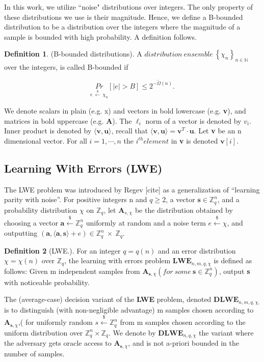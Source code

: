 \documentclass[10pt,journal,compsoc]{IEEEtran}
\theoremstyle{definition}
\newtheorem{definition}{Definition}[section]
\begin{document}
In this work, we utilize ``noise" distributions over integers. The only property of these distributions we use is their magnitude. Hence, we define a B-bounded distribution to be a distribution over the integers where the magnitude of a sample is bounded with high probability. A definition follows.


\begin{definition}

(B-bounded distributions). A $distribution\ ensemble \ \left\{ \chi_n \right\}_{n \in \mathbb{N}}$ over the integers, is called B-bounded if 

$$\underset{e \ \xleftarrow{\$} \ \chi_n}{Pr} \left[ \left| e\right|> B\right] \leq 2^{-\widetilde{\Omega}\left(n\right)}.$$

We denote scalars in plain (e.g. x) and vectors in bold lowercase (e.g. \textbf{v}), and matrices in bold uppercase (e.g. \textbf{A}).  The $\ell_i$ norm of a vector is denoted by $v_i$. Inner product is denoted by $\langle \textbf{v},\textbf{u} \rangle$, recall that $\langle \textbf{v},\textbf{u} \rangle = \textbf{v}^T \cdot \textbf{u}$. Let \textbf{v} be an n dimensional vector. For all $i = 1,\cdots,n$ the $i^{th} element$ in \textbf{v} is denoted $\textbf{v}[i]$.

\end{definition}

\subsection{Learning With Errors (LWE)}

The LWE problem was introduced by Regev [cite] as a generalization of “learning parity with
noise”. For positive integers n and $q \geq 2$, a vector $\textbf{s}\in \mathbb{Z}^n_q$, and a probability distribution $\chi$ on $\mathbb{Z}_q$, let $\textbf{A}_{s,\chi}$ be the distribution  obtained by choosing a vector $\textbf{a} \xleftarrow{\$} \mathbb{Z}_q^n$ uniformly at random  and a noise term $e \xleftarrow{\$}\chi$, and outputting $\left(\textbf{a},\langle\textbf{a},\textbf{s}\rangle + e\right) \in \mathbb{Z}_q^n \ \times \ \mathbb{Z}_q$.

\begin{definition}[LWE.]
 For an integer $q = q(n)$ and an error distribution $\chi = \chi(n)$ over $\mathbb{Z}_q$, the
learning with errors problem $\textbf{LWE}_{n,m,q,\chi}$ is defined as follows: Given m independent samples from $\textbf{A}_{\textbf{s},\chi} \left(for\ some \ \textbf{s} \in \mathbb{Z}_q^n\right)$, output \textbf{s} with noticeable probability. 

	
The (average-case) decision variant of the \textbf{LWE} problem, denoted $\textbf{DLWE}_{n,m,q,\chi,}$  is to distinguish (with non-negligible advantage) m samples chosen according to $\textbf{A}_{\textbf{s},\chi}$,( for uniformly random $s\xleftarrow{\$} \mathbb{Z}_q^n$ 
from m samples chosen according to the uniform distribution over $\mathbb{Z}_q^n \times \mathbb{Z}_q$.  We denote by $\textbf{DLWE}_{n,q,\chi}$ the variant where the adversary gets oracle access to $\textbf{A}_{\textbf{s},\chi}$, and is not a-priori bounded in the number of samples.


\end{definition}
\end{document}
